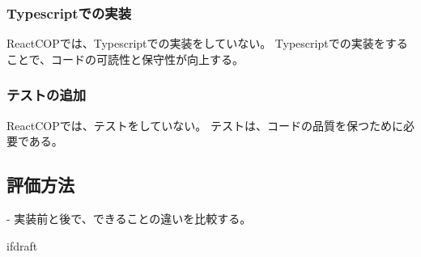 \documentclass{jsarticle}
\begin{document}
\subsubsection{Typescriptでの実装}
ReactCOPでは、Typescriptでの実装をしていない。
Typescriptでの実装をすることで、コードの可読性と保守性が向上する。

\subsubsection{テストの追加}
ReactCOPでは、テストをしていない。
テストは、コードの品質を保つために必要である。

\subsection{評価方法}
- 実装前と後で、できることの違いを比較する。

\expandafter\ifx\csname ifdraft\endcsname\relax
\end{document}

